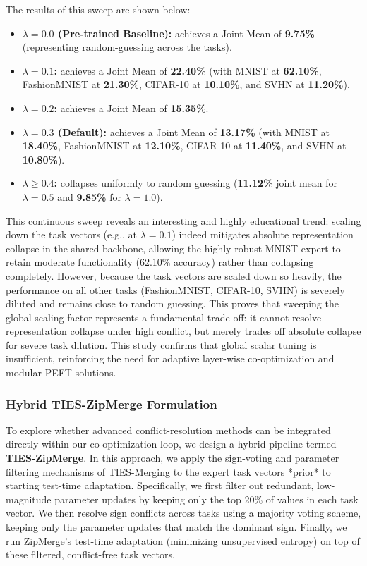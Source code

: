 The results of this sweep are shown below:
\begin{itemize}[leftmargin=*]
    \item \textbf{$\lambda = 0.0$ (Pre-trained Baseline):} achieves a Joint Mean of \textbf{9.75\%} (representing random-guessing across the tasks).
    \item \textbf{$\lambda = 0.1$:} achieves a Joint Mean of \textbf{22.40\%} (with MNIST at \textbf{62.10\%}, FashionMNIST at \textbf{21.30\%}, CIFAR-10 at \textbf{10.10\%}, and SVHN at \textbf{11.20\%}).
    \item \textbf{$\lambda = 0.2$:} achieves a Joint Mean of \textbf{15.35\%}.
    \item \textbf{$\lambda = 0.3$ (Default):} achieves a Joint Mean of \textbf{13.17\%} (with MNIST at \textbf{18.40\%}, FashionMNIST at \textbf{12.10\%}, CIFAR-10 at \textbf{11.40\%}, and SVHN at \textbf{10.80\%}).
    \item \textbf{$\lambda \ge 0.4$:} collapses uniformly to random guessing (\textbf{11.12\%} joint mean for $\lambda = 0.5$ and \textbf{9.85\%} for $\lambda = 1.0$).
\end{itemize}

This continuous sweep reveals an interesting and highly educational trend: scaling down the task vectors (e.g., at $\lambda = 0.1$) indeed mitigates absolute representation collapse in the shared backbone, allowing the highly robust MNIST expert to retain moderate functionality (62.10\% accuracy) rather than collapsing completely. However, because the task vectors are scaled down so heavily, the performance on all other tasks (FashionMNIST, CIFAR-10, SVHN) is severely diluted and remains close to random guessing. This proves that sweeping the global scaling factor represents a fundamental trade-off: it cannot resolve representation collapse under high conflict, but merely trades off absolute collapse for severe task dilution. This study confirms that global scalar tuning is insufficient, reinforcing the need for adaptive layer-wise co-optimization and modular PEFT solutions.

\subsubsection{Hybrid TIES-ZipMerge Formulation}
To explore whether advanced conflict-resolution methods can be integrated directly within our co-optimization loop, we design a hybrid pipeline termed \textbf{TIES-ZipMerge}. In this approach, we apply the sign-voting and parameter filtering mechanisms of TIES-Merging \cite{yadav2023ties} to the expert task vectors *prior* to starting test-time adaptation. Specifically, we first filter out redundant, low-magnitude parameter updates by keeping only the top 20\% of values in each task vector. We then resolve sign conflicts across tasks using a majority voting scheme, keeping only the parameter updates that match the dominant sign. Finally, we run ZipMerge's test-time adaptation (minimizing unsupervised entropy) on top of these filtered, conflict-free task vectors.

